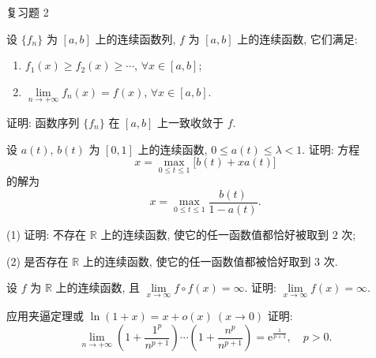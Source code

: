 \begin{exblock}{复习题 2}
    \item 设 $\{f_n\}$ 为 $[a,b]$ 上的连续函数列, $f$ 为 $[a,b]$ 上的连续函数, 它们满足:
    \begin{enumerate}
        \item $f_1(x) \geqslant f_2(x) \geqslant \cdots$, $\forall x \in [a,b]$;
        \item $\lim\limits_{n\to+\infty} f_n(x) = f(x)$, $\forall x \in [a,b]$.
    \end{enumerate}
    证明: 函数序列 $\{f_n\}$ 在 $[a,b]$ 上一致收敛于 $f$.

    \item 设 $a(t)$, $b(t)$ 为 $[0,1]$ 上的连续函数, $0 \leqslant a(t) \leqslant \lambda < 1$. 证明: 方程
    \[
    x = \max_{0\leqslant t\leqslant1} \bigl[b(t) + x a(t)\bigr]
\]
    的解为
    \[
    x = \max_{0\leqslant t\leqslant1} \frac{b(t)}{1 - a(t)}.
\]

    \item (1) 证明: 不存在 $\mathbb{R}$ 上的连续函数, 使它的任一函数值都恰好被取到 $2$ 次;

    (2) 是否存在 $\mathbb{R}$ 上的连续函数, 使它的任一函数值都被恰好取到 $3$ 次.

    \item 设 $f$ 为 $\mathbb{R}$ 上的连续函数, 且 $\lim\limits_{x\to\infty} f \circ f(x) = \infty$. 证明: $\lim\limits_{x\to\infty} f(x) = \infty$.

    \item 应用夹逼定理或 $\ln(1 + x) = x + o(x)\ (x \to 0)$ 证明:
    \[
    \lim_{n\to+\infty} \left(1 + \frac{1^p}{n^{p+1}}\right) \cdots \left(1 + \frac{n^p}{n^{p+1}}\right) = \mathrm{e}^{\frac{1}{p+1}},\quad p > 0.
\]
\end{exblock}
